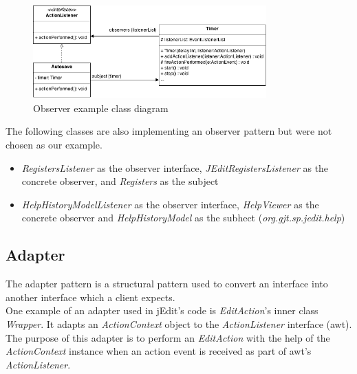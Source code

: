 
\begin{figure}[h!]
    \includegraphics[width=0.8\textwidth]{images/observer.png}
    \centering
    \caption{Observer example class diagram}
\end{figure}

\begin{framehint}
    The following classes are also implementing an observer pattern but were
    not chosen as our example.

    \begin{itemize}\itemsep1pt
        \item \emph{RegistersListener} as the observer interface,
        \emph{JEditRegistersListener} as the concrete observer, and
        \emph{Registers} as the subject

        \item \emph{HelpHistoryModelListener} as the observer interface,
          \emph{HelpViewer} as the concrete observer and \emph{HelpHistoryModel}
          as the subhect (\emph{org.gjt.sp.jedit.help})
    \end{itemize}
\end{framehint}
\newpage

\subsection[Adapter]{Adapter \cite{cite:soAdapterDiff}}
The adapter pattern is a structural pattern used to convert an interface into
another interface which a client expects.\\

One example of an adapter used in jEdit's code is \emph{EditAction}'s
inner class \emph{Wrapper}. It adapts an \emph{ActionContext} object to
the \emph{ActionListener} interface (awt). The purpose of this adapter
is to perform an \emph{EditAction} with the help of the
\emph{ActionContext} instance when an action event is received as part
of awt's \emph{ActionListener}.

